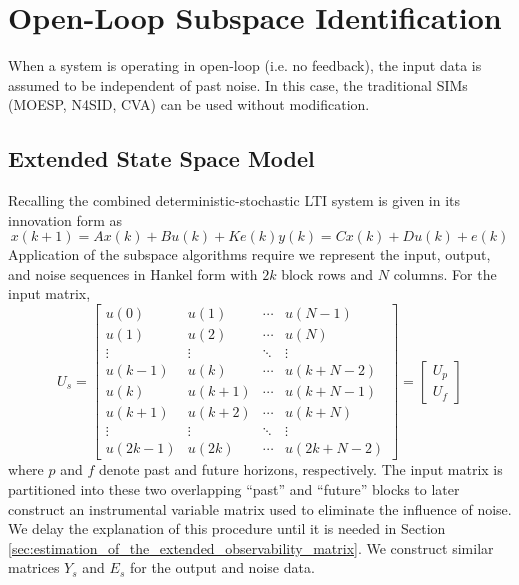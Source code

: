 \section{Open-Loop Subspace Identification}
When a system is operating in open-loop (i.e. no feedback), the input data is assumed to be independent of past noise. In this case, the traditional SIMs (MOESP, N4SID, CVA) can be used without modification. 

\subsection{Extended State Space Model}\label{sec:extended_state_space_model}
Recalling the combined deterministic-stochastic LTI system is given in its innovation form as
\begin{subequations}\label{eq:3_innovation}
\begin{equation}x(k+1) = Ax(k) + Bu(k) + Ke(k)\end{equation}
\begin{equation}y(k) = Cx(k) + Du(k) + e(k)\end{equation}
\end{subequations}
Application of the subspace algorithms require we represent the input, output, and noise sequences in Hankel form with $2k$ block rows and $N$ columns. For the input matrix,
\begin{equation}\label{eq:3_input}
U_s = \begin{bmatrix}
u(0) & u(1) & \cdots & u(N-1)\\
u(1) & u(2) & \cdots & u(N)\\
\vdots & \vdots & \ddots & \vdots\\
u(k-1) & u(k) & \cdots & u(k+N-2)\\
\hline
u(k) & u(k+1) & \cdots & u(k+N-1)\\
u(k+1) & u(k+2) & \cdots & u(k+N)\\
\vdots & \vdots & \ddots & \vdots\\
u(2k-1) & u(2k) & \cdots & u(2k+N-2)
\end{bmatrix} = 
\begin{bmatrix} U_p\\ \hline U_f\end{bmatrix}
\end{equation}
where $p$ and $f$ denote past and future horizons, respectively. The input matrix is partitioned into these two overlapping ``past'' and ``future'' blocks to later construct an instrumental variable matrix used to eliminate the influence of noise. We delay the explanation of this procedure until it is needed in Section \ref{sec:estimation_of_the_extended_observability_matrix}. We construct similar matrices $Y_s$ and $E_s$ for the output and noise data.

